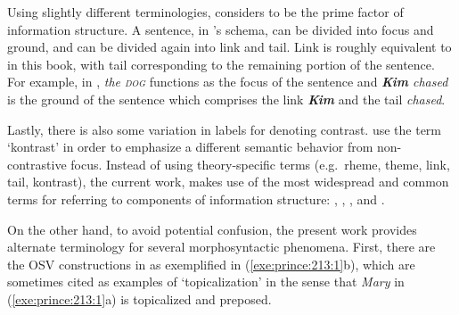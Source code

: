 Using slightly different terminologies, \citet{vallduvi:90} considers
 to be the prime factor of information structure.  A
sentence, in \citeauthor{vallduvi:90}'s schema, can be divided into
focus and ground, and  can be divided again into link and
tail. Link is roughly equivalent to  in this book, with
tail corresponding to the remaining portion of the sentence. For
example, in , \textit{the \textsc{dog}}
functions as the focus of the sentence and \textit{\textbf{Kim}
  chased} is the ground of the sentence which comprises the link
\textit{\textbf{Kim}} and the tail \textit{chased}.




\noindent Lastly, there is also some variation in labels for denoting
contrast.  \citet{vallduvi:vilkuna:98} use the term `kontrast' in
order to emphasize a different semantic behavior from non-contrastive
focus.  Instead of using theory-specific terms (e.g.\ rheme, theme,
link, tail, kontrast), the current work, makes use of the most
widespread and common terms for referring to components of information
structure: , , , and
.


On the other hand, to avoid potential confusion, the present work
provides alternate terminology for several morphosyntactic phenomena.
First, there are the OSV constructions in  as exemplified in
(\ref{exe:prince:213:1}b), which are sometimes cited as examples of
`topicalization' in the sense that \textit{Mary} in
(\ref{exe:prince:213:1}a) is topicalized and preposed.


